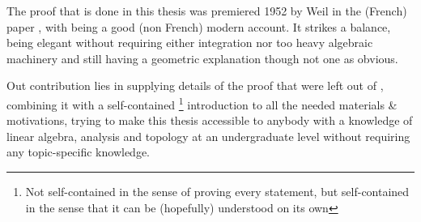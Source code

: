 The proof that is done in this thesis was premiered 1952 by Weil in the (French) paper \cite{weil_sur_1952},
with \cite{tu_differential_1982} being a good (non French) modern account. It strikes a balance, being elegant
without requiring either integration nor too heavy algebraic machinery and still having a geometric explanation
though not one as obvious.

Out contribution lies in supplying details of the proof that were left out of \cite{tu_differential_1982}, combining
it with a self-contained
\footnote{
	Not self-contained in the sense of proving every statement, but self-contained in the sense that it can be
	(hopefully) understood on its own
}
introduction to all the needed materials \& motivations, trying to make this thesis accessible to anybody with a
knowledge of linear algebra, analysis and topology at an undergraduate level without requiring any topic-specific knowledge.
 
